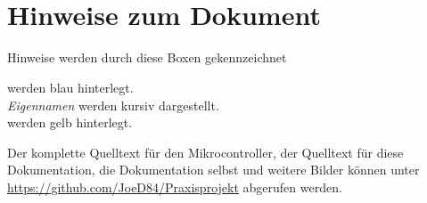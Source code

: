 \documentclass[
	11pt,					%
	ngerman,					%
	a4paper,         		%
	oneside,				%
	titlepage,				%
	final					%
]{report}
\begin{document}
\setcounter{secnumdepth}{3}
\setcounter{tocdepth}{3}

\title{\titel \\ \untertitel}
\maketitle

%

\tableofcontents								%

%		


\listoffigures						%
\listoftables						%
\renewcommand{\lstlistlistingname}{Codeverzeichnis}
\lstlistoflistings					%

\chapter*{Hinweise zum Dokument}
Hinweise werden durch diese Boxen gekennzeichnet

 werden blau hinterlegt.\\

\emph{Eigennamen} werden kursiv dargestellt.\\

 werden gelb hinterlegt.\\

\lstset{language=C, basicstyle=\footnotesize, showstringspaces=false, tabsize=8}

Der komplette Quelltext für den Mikrocontroller, der Quelltext für diese Dokumentation, die Dokumentation selbst und weitere Bilder können unter \url{https://github.com/JoeD84/Praxisprojekt} abgerufen werden.
\clearpage
{}
\end{document}
